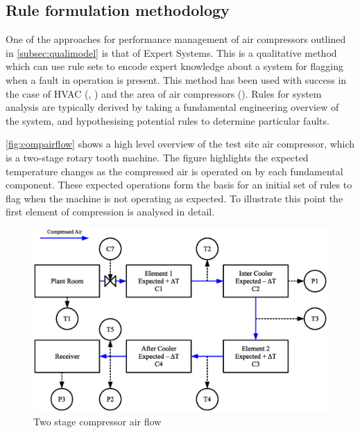 \subsection{Rule formulation methodology}
\label{subsec:rulemethodology}

One of the approaches for performance management of air compressors outlined in \autoref{subsec:qualimodel} is that of Expert Systems. This is a qualitative method which can use rule sets to encode expert knowledge about a system for flagging when a fault in operation is present. This method has been used with success in the case of HVAC (\cite{Bruton2014}, \cite{House2001}) and the area of air compressors (\cite{Liu2001}). Rules for system analysis are typically derived by taking a fundamental engineering overview of the system, and hypothesising potential rules to determine particular faults.

\autoref{fig:compairflow} shows a high level overview of the test site air compressor, which is a two-stage rotary tooth machine. The figure highlights the expected temperature changes as the compressed air is operated on by each fundamental component. These expected operations form the basis for an initial set of rules to flag when the machine is not operating as expected. To illustrate this point the first element of compression is analysed in detail.

\begin{figure}
\includegraphics[width = \textwidth]{./Images/2StageRotaryCompressorIdeal.eps}
\caption{Two stage compressor air flow}
\label{fig:compairflow}
\end{figure}

